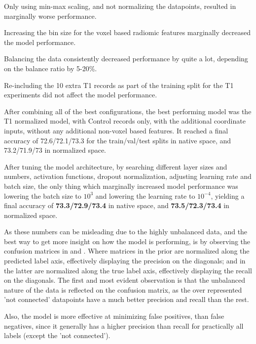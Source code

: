 Only using min-max scaling, and not normalizing the datapoints, resulted in marginally worse performance.\par
Increasing the bin size for the voxel based radiomic features marginally decreased the model performance.\par
Balancing the data consistently decreased performance by quite a lot, depending on the balance ratio by 5-20\%.\par
Re-including the 10 extra T1 records as part of the training split for the T1 experiments did not affect the model performance.\par
After combining all of the best configurations, the best performing model was the T1 normalized model, with Control records only, with the additional coordinate inputs, without any additional non-voxel based features. It reached a final accuracy of 72.6/72.1/73.3 for the train/val/test splits in native space, and 73.2/71.9/73 in normalized space.\par
After tuning the model architecture, by searching different layer sizes and numbers, activation functions, dropout normalization, adjusting learning rate and batch size, the only thing which marginally increased model performance was lowering the batch size to $10^3$ and lowering the learning rate to $10^{-4}$, yielding a final accuracy of \textbf{73.3/72.9/73.4} in native space, and \textbf{73.5/72.3/73.4} in normalized space.\par
As these numbers can be misleading due to the highly unbalanced data, and the best way to get more insight on how the model is performing, is by observing the confusion matrices in  and . Where matrices in the prior  are normalized along the predicted label axis, effectively displaying the precision on the diagonals; and in the latter  are normalized along the true label axis, effectively displaying the recall on the diagonals. The first and most evident observation is that the unbalanced nature of the data is reflected on the confusion matrix, as the over represented 'not connected' datapoints have a much better precision and recall than the rest.\par
Also, the model is more effective at minimizing false positives, than false negatives, since it generally has a higher precision than recall for practically all labels (except the 'not connected').

